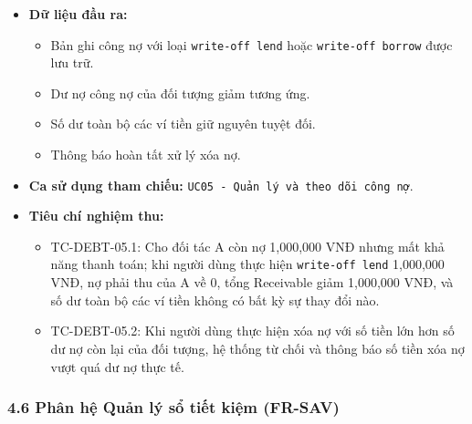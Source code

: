 \documentclass[11pt,a4paper]{article}
\providecommand{\tightlist}{
  \setlength{\itemsep}{0pt}\setlength{\parskip}{0pt}}
\begin{document}
\begin{itemize}
\begin{itemize}
    \begin{itemize}
    \tightlist
    \item
      Kiểm tra số tiền xóa nợ không được vượt quá số dư phải trả còn
      lại: \(amount \le Payable_{person}\).
    \item
      Giảm khoản phải trả \(Payable_{person}\) và tổng \(Payable\) của
      hệ thống.
    \item
      Tuyệt đối không xuất tiền từ ví tiền mặt nào (nghiệp vụ phi tiền
      mặt).
    \item
      Ghi nhận khoản thu nhập bất thường do được xóa nợ.
    \end{itemize}
  \end{itemize}
\item
  \textbf{Dữ liệu đầu ra:}

  \begin{itemize}
  \tightlist
  \item
    Bản ghi công nợ với loại \texttt{write-off\ lend} hoặc
    \texttt{write-off\ borrow} được lưu trữ.
  \item
    Dư nợ công nợ của đối tượng giảm tương ứng.
  \item
    Số dư toàn bộ các ví tiền giữ nguyên tuyệt đối.
  \item
    Thông báo hoàn tất xử lý xóa nợ.
  \end{itemize}
\item
  \textbf{Ca sử dụng tham chiếu:}
  \texttt{UC05\ -\ Quản\ lý\ và\ theo\ dõi\ công\ nợ}.
\item
  \textbf{Tiêu chí nghiệm thu:}

  \begin{itemize}
  \tightlist
  \item
    TC-DEBT-05.1: Cho đối tác A còn nợ 1,000,000 VNĐ nhưng mất khả năng
    thanh toán; khi người dùng thực hiện \texttt{write-off\ lend}
    1,000,000 VNĐ, nợ phải thu của A về 0, tổng Receivable giảm
    1,000,000 VNĐ, và số dư toàn bộ các ví tiền không có bất kỳ sự thay
    đổi nào.
  \item
    TC-DEBT-05.2: Khi người dùng thực hiện xóa nợ với số tiền lớn hơn số
    dư nợ còn lại của đối tượng, hệ thống từ chối và thông báo số tiền
    xóa nợ vượt quá dư nợ thực tế.
  \end{itemize}
\end{itemize}

\newpage

\subsubsection{4.6 Phân hệ Quản lý sổ tiết kiệm
(FR-SAV)}\label{46-phuxe2n-hux1ec7-quux1ea3n-luxfd-sux1ed5-tiux1ebft-kiux1ec7m-fr-sav}
\end{document}
